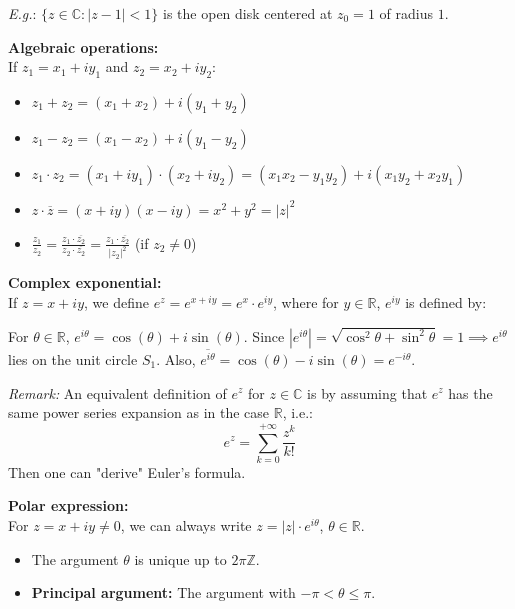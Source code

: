 \textit{E.g.}: $\{z \in \mathbb{C} : |z-1| < 1\}$ is the open disk centered at $z_{0} = 1$ of radius $1$.

\textbf{Algebraic operations:} \\
If $z_{1} = x_{1} + iy_{1}$ and $z_{2} = x_{2} + iy_{2}$:
\begin{itemize}
    \item $z_{1} + z_{2} = (x_{1} + x_{2}) + i(y_{1} + y_{2})$
    \item $z_{1} - z_{2} = (x_{1} - x_{2}) + i(y_{1} - y_{2})$
    \item $z_{1} \cdot z_{2} = (x_{1} + iy_{1}) \cdot (x_{2} + iy_{2}) = (x_{1}x_{2} - y_{1}y_{2}) + i(x_{1}y_{2} + x_{2}y_{1})$
    \item $z \cdot \overline{z} = (x + iy)(x - iy) = x^{2} + y^{2} = |z|^{2}$
    \item $\displaystyle \frac{z_{1}}{z_{2}} = \frac{z_{1} \cdot \overline{z_{2}}}{z_{2} \cdot \overline{z_{2}}} = \frac{z_{1} \cdot \overline{z_{2}}}{|z_{2}|^{2}}$ \quad (if $z_{2} \neq 0$)
\end{itemize}

\textbf{Complex exponential:} \\
If $z = x + iy$, we define $e^{z} = e^{x+iy} = e^{x} \cdot e^{iy}$, where for $y \in \mathbb{R}$, $e^{iy}$ is defined by:

\begin{theorem}
For $\theta \in \mathbb{R}$, $e^{i\theta} = \cos(\theta) + i\sin(\theta)$.
Since $|e^{i\theta}| = \sqrt{\cos^2\theta + \sin^2\theta} = 1 \implies e^{i\theta}$ lies on the unit circle $S_{1}$.
Also, $\overline{e^{i\theta}} = \cos(\theta) - i\sin(\theta) = e^{-i\theta}$.
\end{theorem}

\textit{Remark:} An equivalent definition of $e^{z}$ for $z \in \mathbb{C}$ is by assuming that $e^{z}$ has the same power series expansion as in the case $\mathbb{R}$, i.e.:
$$e^{z} = \sum_{k=0}^{+\infty} \frac{z^{k}}{k!}$$
Then one can "derive" Euler's formula.

\textbf{Polar expression:} \\
For $z = x + iy \neq 0$, we can always write $z = |z| \cdot e^{i\theta}$, $\theta \in \mathbb{R}$.
\begin{itemize}
    \item The argument $\theta$ is unique up to $2\pi\mathbb{Z}$.
    \item \textbf{Principal argument:} The argument with $-\pi < \theta \leq \pi$.
\end{itemize}

